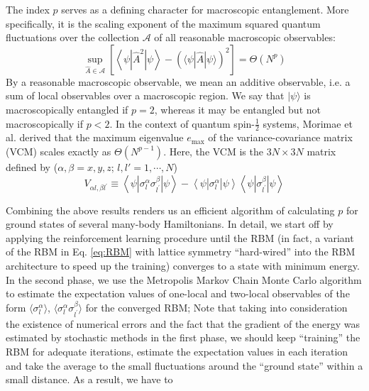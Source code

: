 \documentclass[aps,prl,reprint,superscriptaddress]{revtex4-2}
\begin{document}
The index $ p $ serves as a defining character for macroscopic entanglement. More specifically, it is the scaling exponent of the maximum squared quantum fluctuations over the collection $ \mathcal{A} $ of all reasonable macroscopic observables:
\begin{equation}
	\sup_{\hat{A} \in \mathcal{A}} \left[ \left\langle \psi \left| \hat{A}^{2} \right| \psi \right\rangle - (\langle \psi | \hat{A} | \psi \rangle)^{2} \right] = \Theta \left( N^{p} \right)
\end{equation}
By a reasonable macroscopic observable, we mean an additive observable, i.e. a sum of local observables over a macroscopic region. We say that $ | \psi \rangle $ is macroscopically entangled if $ p = 2 $, whereas it may be entangled but not macroscopically if $ p < 2 $. In the context of quantum spin-$ \frac{1}{2} $ systems, Morimae et al. \cite{Morimae2005Macroscopic} derived that the maximum eigenvalue $ e_{\max} $ of the variance-covariance matrix (VCM) scales exactly as $ \Theta \left( N^{p-1} \right) $. Here, the VCM is the $ 3N \times 3N $ matrix defined by ($ \alpha,\beta = x,y,z $; $ l,l' = 1,\cdots,N $)
\begin{equation}
	V_{\alpha l, \beta l^{\prime}} \equiv \left\langle \psi \left| \sigma_{l}^{\alpha} \sigma_{l^{\prime}}^{\beta} \right| \psi \right\rangle - \left\langle \psi \left| \sigma_{l}^{\alpha} \right| \psi \right\rangle \left\langle \psi\left| \sigma_{l^{\prime}}^{\beta} \right| \psi \right\rangle
\end{equation}

Combining the above results renders us an efficient algorithm of calculating $ p $ for ground states of several many-body Hamiltonians. In detail, we start off by applying the reinforcement learning procedure until the RBM (in fact, a variant of the RBM in Eq. \eqref{eq:RBM} with lattice symmetry ``hard-wired'' into the RBM architecture to speed up the training) converges to a state with minimum energy. In the second phase, we use the Metropolis Markov Chain Monte Carlo algorithm to estimate the expectation values of one-local and two-local observables of the form $ \langle \sigma_l^{\alpha} \rangle $, $ \langle \sigma_{l}^{\alpha} \sigma_{l^{\prime}}^{\beta} \rangle $ for the converged RBM; Note that taking into consideration the existence of numerical errors and the fact that the gradient of the energy was estimated by stochastic methods in the first phase, we should keep ``training'' the RBM for adequate iterations, estimate the expectation values in each iteration and take the average to  the small fluctuations around the
“ground state” within a small distance. As a result, we have to 
\end{document}
